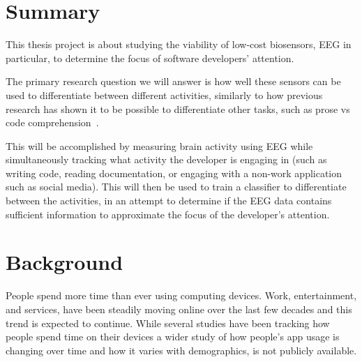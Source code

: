 \documentclass{IEEEtran}
\begin{document}
\begin{refsection}

\newcommand{\RQmain}{How well can data from low-cost EEG sensors be used to train a classifier separating software developers' device activities?}

\section{Summary}

This thesis project is about studying the viability of low-cost biosensors, EEG in particular, to determine the focus of software developers' attention. %

The primary research question we will answer is how well these sensors can be used to differentiate between different activities, similarly to how previous research has shown it to be possible to differentiate other tasks, such as prose vs code comprehension~\cite{fucci_replication_2019}.

This will be accomplished by measuring brain activity using EEG while simultaneously tracking what activity the developer is engaging in (such as writing code, reading documentation, or engaging with a non-work application such as social media). This will then be used to train a classifier to differentiate between the activities, in an attempt to determine if the EEG data contains sufficient information to approximate the focus of the developer's attention.


\section{Background}

People spend more time than ever using computing devices. Work, entertainment, and services, have been steadily moving online over the last few decades and this trend is expected to continue.
While several studies have been tracking how people spend time on their devices a wider study of how people's app usage is changing over time and how it varies with demographics, is not publicly available.


\end{refsection}
\end{document}
